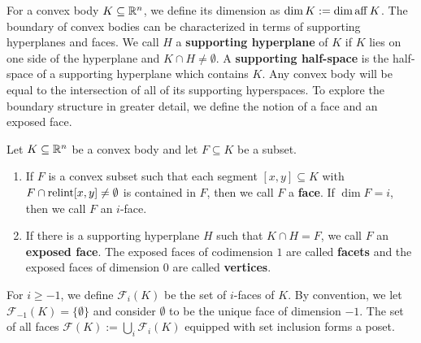 \documentclass{puthesis-UG}
\begin{document}
For a convex body $K \subseteq \mathbb{R}^n$, we define its dimension as $\dim K := \dim \operatorname{aff} K$. The boundary of convex bodies can be characterized in terms of supporting hyperplanes and faces. We call $H$ a \textbf{supporting hyperplane} of $K$ if $K$ lies on one side of the hyperplane and $K \cap H \neq \emptyset$. A \textbf{supporting half-space} is the half-space of a supporting hyperplane which contains $K$. Any convex body will be equal to the intersection of all of its supporting hyperspaces. To explore the boundary structure in greater detail, we define the notion of a face and an exposed face. 
\begin{defn} \label{face-and-exposed-face}
	Let $K \subseteq \mathbb{R}^n$ be a convex body and let $F \subseteq K$ be a subset. 
	\begin{enumerate}[label = (\alph*)]
		\item If $F$ is a convex subset such that each segment $[x, y] \subseteq K$ with $F \cap \operatorname{relint} [x, y] \neq \emptyset$ is contained in $F$, then we call $F$ a \textbf{face}. If $\dim F = i$, then we call $F$ an $i$-face. 

		\item If there is a supporting hyperplane $H$ such that $K \cap H = F$, we call $F$ an \textbf{exposed face}. The exposed faces of codimension $1$ are called \textbf{facets} and the exposed faces of dimension $0$ are called \textbf{vertices}. 
	\end{enumerate}
	For $i \geq -1$, we define $\mathcal{F}_i(K)$ be the set of $i$-faces of $K$. By convention, we let $\mathcal{F}_{-1}(K) = \{\emptyset\}$ and consider $\emptyset$ to be the unique face of dimension $-1$. The set of all faces $\mathcal{F}(K) := \bigcup_i \mathcal{F}_i(K)$ equipped with set inclusion forms a poset. 
\end{defn}
\end{document}
